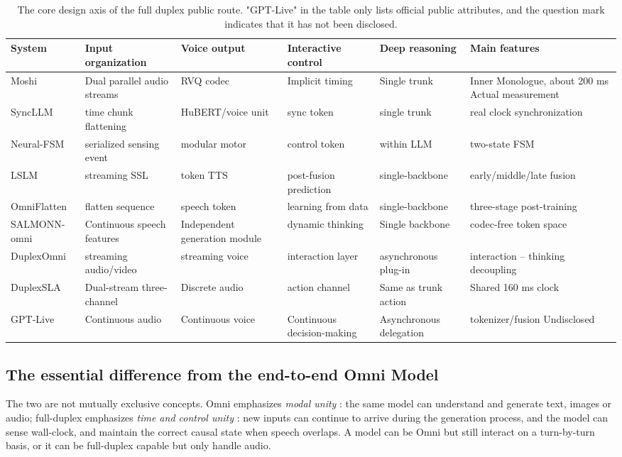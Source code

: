 \documentclass[UTF8,fontset=none,a4paper,10pt]{ctexart}
\begin{document}
\begin{table}[H]
\centering\scriptsize
\setlength{\tabcolsep}{3pt}
\caption{The core design axis of the full duplex public route. "GPT-Live" in the table only lists official public attributes, and the question mark indicates that it has not been disclosed.}
\begin{tabularx}{\textwidth}{lXXXXX}
\toprule
System & Input organization & Voice output & Interactive control & Deep reasoning & Main features \\
\midrule
Moshi & Dual parallel audio streams & RVQ codec & Implicit timing & Single trunk & Inner Monologue, about 200 ms Actual measurement \\
SyncLLM & time chunk flattening & HuBERT/voice unit & sync token & single trunk & real clock synchronization \\
Neural-FSM & serialized sensing event & modular motor & control token & within LLM & two-state FSM \\
LSLM & streaming SSL & token TTS & post-fusion prediction & single-backbone & early/middle/late fusion \\
OmniFlatten & flatten sequence & speech token & learning from data & single-backbone & three-stage post-training \\
SALMONN-omni & Continuous speech features & Independent generation module & dynamic thinking & Single backbone & codec-free token space \\
DuplexOmni & streaming audio/video & streaming voice & interaction layer & asynchronous plug-in & interaction -- thinking decoupling \\
DuplexSLA & Dual-stream three-channel & Discrete audio & action channel & Same as trunk action & Shared 160 ms clock \\
GPT-Live & Continuous audio & Continuous voice & Continuous decision-making & Asynchronous delegation & tokenizer/fusion Undisclosed \\
\bottomrule
\end{tabularx}
\end{table}

\subsection{The essential difference from the end-to-end Omni Model}

The two are not mutually exclusive concepts. Omni emphasizes \emph{ modal unity }: the same model can understand and generate text, images or audio; full-duplex emphasizes \emph{ time and control unity }: new inputs can continue to arrive during the generation process, and the model can sense wall-clock, and maintain the correct causal state when speech overlaps. A model can be Omni but still interact on a turn-by-turn basis, or it can be full-duplex capable but only handle audio.
\end{document}
